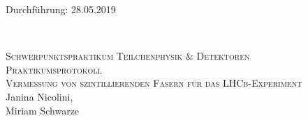 
\usepackage{wrapfig}



\begin{titlepage}
  \begin{flushleft}
 Durchführung: 28.05.2019
  \end{flushleft}


\HRule\\[1,0cm]

 \begin{center}

  \textsc{\Large Schwerpunktspraktikum Teilchenphysik \& Detektoren}\\[1,5cm]
\textsc{\LARGE Praktikumsprotokoll}\\[1.5cm]
\textsc{\huge Vermessung von szintillierenden Fasern für das LHCb-Experiment} \\[5,5cm]

Janina Nicolini\footnotemark[1], \\
Miriam Schwarze\footnotemark[2] \\[1,0cm]



 \end{center}
\HRule

 \vfill

\end{titlepage}






\nocite{*}
\printbibliography


